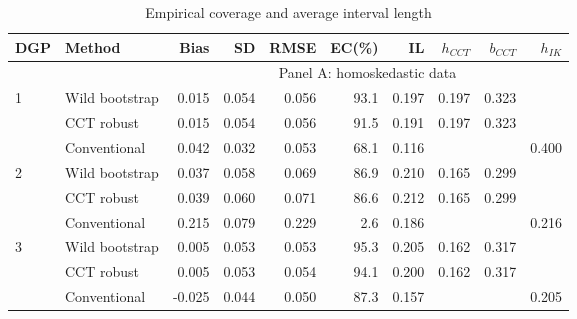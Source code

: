 \documentclass[12pt,]{article}
\DeclareMathOperator{\1}{\mathbbm{1}}
\begin{document}
\begin{table}[ht]
	\begin{threeparttable}
		\caption{Empirical coverage and average interval length}
		\label{tb: basic simulation}
		\begin{tabular}{llrrrrrrrr}
			\hline
			DGP & Method & Bias & SD & RMSE & EC(\%) & IL & $h_{CCT}$ & $b_{CCT}$ & $h_{IK}$ \\ 
			\hline
			&& \multicolumn{8}{c}{Panel A: homoskedastic data} \\ \cline{3-10}
			1 & Wild bootstrap & 0.015 & 0.054 & 0.056 & 93.1 & 0.197 & 0.197 & 0.323 &  \\ 
			& CCT robust & 0.015 & 0.054 & 0.056 & 91.5 & 0.191 & 0.197 & 0.323 &  \\ 
			& Conventional & 0.042 & 0.032 & 0.053 & 68.1 & 0.116 &  &  & 0.400 \\ 
			2 & Wild bootstrap & 0.037 & 0.058 & 0.069 & 86.9 & 0.210 & 0.165 & 0.299 &  \\ 
			& CCT robust & 0.039 & 0.060 & 0.071 & 86.6 & 0.212 & 0.165 & 0.299 &  \\ 
			& Conventional & 0.215 & 0.079 & 0.229 & 2.6 & 0.186 &  &  & 0.216 \\ 
			3 & Wild bootstrap & 0.005 & 0.053 & 0.053 & 95.3 & 0.205 & 0.162 & 0.317 &  \\ 
			& CCT robust & 0.005 & 0.053 & 0.054 & 94.1 & 0.200 & 0.162 & 0.317 &  \\ 
			& Conventional & -0.025 & 0.044 & 0.050 & 87.3 & 0.157 &  &  & 0.205 \\ 
			

\end{tabular}
\end{threeparttable}
\end{table}
\end{document}
